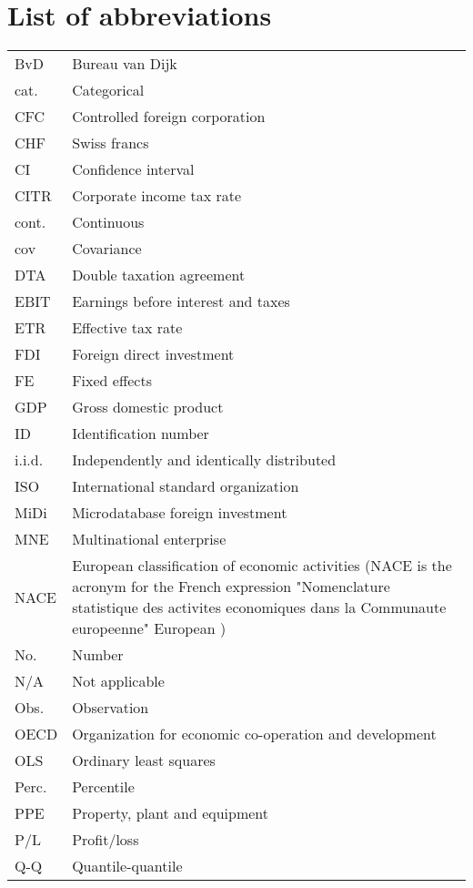 \documentclass[10pt,twocolumn,oneside,cmyk]{article}
\begin{document}
\section*{List of abbreviations}
\begin{center}
 \begin{tabularx}{\textwidth}{l X}
  BvD &Bureau van Dijk\\
  cat. &Categorical \\
  CFC &Controlled foreign corporation \\
  CHF &Swiss francs \\
  CI &Confidence interval \\
  CITR &Corporate income tax rate \\
  cont. &Continuous \\
  cov &Covariance \\
  DTA &Double taxation agreement \\
  EBIT &Earnings before interest and taxes \\
  ETR &Effective tax rate \\
  FDI &Foreign direct investment \\
  FE &Fixed effects \\
  GDP &Gross domestic product \\
  ID &Identification number \\
  i.i.d. &Independently and identically distributed \\
  ISO &International standard organization \\
  MiDi &Microdatabase foreign investment \\
  MNE &Multinational enterprise \\
  NACE &European classification of economic activities (NACE is the acronym for the French expression "Nomenclature statistique des activites economiques dans la Communaute europeenne" European \textcite[5]{european_commission_nace_2008})\\
  No. &Number \\
  N/A &Not applicable \\
  Obs. &Observation \\
  OECD &Organization for economic co-operation and development \\
  OLS &Ordinary least squares \\
  Perc. &Percentile \\
  PPE &Property, plant and equipment \\
  P/L &Profit/loss \\
  Q-Q &Quantile-quantile \\

\end{tabularx}
\end{center}
\end{document}

